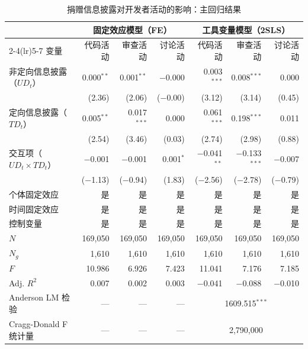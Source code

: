 \documentclass[
    type = master, %
    degree = professional,        %
    decl-page,  %
    twoside,                %
    fontset = fandol %
  ]{njuthesis}
\begin{document}
\begin{table}[htbp]
    \centering
    \caption{捐赠信息披露对开发者活动的影响：主回归结果}
    \label{tab:main-results}
    \small
    \begin{tabularx}{\textwidth}{Xrrrrrr}
        \toprule
        & \multicolumn{3}{c}{固定效应模型（FE）}
        & \multicolumn{3}{c}{工具变量模型（2SLS）} \\
        \cmidrule(lr){2-4}\cmidrule(lr){5-7}
        变量
            & 代码活动 & 审查活动 & 讨论活动
            & 代码活动 & 审查活动 & 讨论活动 \\
        \midrule
        非定向信息披露（$UD_t$）
            & 0.000$^{**}$  & 0.001$^{**}$  & $-$0.000
            & 0.003$^{***}$ & 0.008$^{***}$ & 0.000 \\
            & (2.36)        & (2.06)        & ($-$0.00)
            & (3.12)        & (3.14)        & (0.45) \\[0.4em]
        定向信息披露（$TD_t$）
            & 0.005$^{**}$  & 0.017$^{***}$ & 0.000
            & 0.061$^{***}$ & 0.198$^{***}$ & 0.011 \\
            & (2.54)        & (3.46)        & (0.03)
            & (2.74)        & (2.98)        & (0.88) \\[0.4em]
        交互项（$UD_t \times TD_t$）
            & $-$0.001      & $-$0.001      & 0.001$^{*}$
            & $-$0.041$^{**}$ & $-$0.133$^{***}$ & $-$0.007 \\
            & ($-$1.13)     & ($-$0.94)     & (1.83)
            & ($-$2.56)     & ($-$2.78)     & ($-$0.79) \\[0.4em]
        \midrule
        个体固定效应 & 是 & 是 & 是 & 是 & 是 & 是 \\
        时间固定效应 & 是 & 是 & 是 & 是 & 是 & 是 \\
        控制变量     & 是 & 是 & 是 & 是 & 是 & 是 \\
        \midrule
        $N$         & 169,050 & 169,050 & 169,050 & 169,050 & 169,050 & 169,050 \\
        $N_g$       & 1,610   & 1,610   & 1,610   & 1,610   & 1,610   & 1,610 \\
        $F$         & 10.986  & 6.926   & 7.423   & 11.041  & 7.176   & 7.185 \\
        Adj. $R^2$  & 0.007   & 0.002   & 0.003   & $-$0.041 & $-$0.088 & $-$0.010 \\
        Anderson LM 检验    & --- & --- & --- & \multicolumn{3}{c}{1609.515$^{***}$} \\
        Cragg-Donald F 统计量 & --- & --- & --- & \multicolumn{3}{c}{2,790,000} \\

\end{tabularx}
\end{table}
\end{document}
